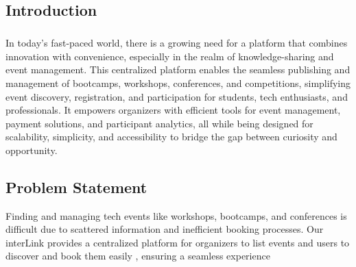 \documentclass[twoside,a4paper,openright]{report} %
\begin{document}









\begin{flushleft}
	\setcounter{page}{0}
	\chapter{Introduction}
\end{flushleft}
\paragraph{}
\hspace{1.5cm}
In today's fast-paced world, there is a growing need for a platform that combines innovation with convenience, especially in the realm of knowledge-sharing and event management. This centralized platform enables the seamless publishing and management of bootcamps, workshops, conferences, and competitions, simplifying event discovery, registration, and participation for students, tech enthusiasts, and professionals. It empowers organizers with efficient tools for event management, payment solutions, and participant analytics, all while being designed for scalability, simplicity, and accessibility to bridge the gap between curiosity and opportunity.







\begin{flushleft}
	\chapter{Problem Statement}
\end{flushleft}

\hspace{1.5cm}
Finding and managing tech events like workshops, bootcamps, and conferences is difficult due to scattered information and inefficient booking processes. Our  interLink provides a centralized platform for organizers to list events and users to discover and book them easily , ensuring a seamless experience







\vspace{1.0 cm}
\end{document}
